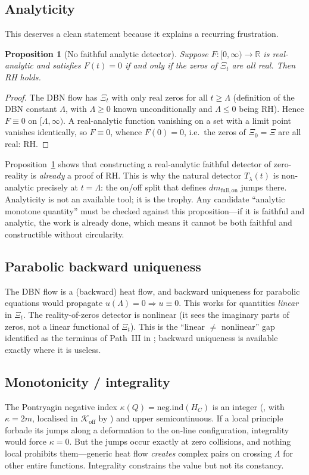 \documentclass[11pt]{amsart}
\newtheorem{proposition}[theorem]{Proposition}
\theoremstyle{definition}
\theoremstyle{remark}
\newcommand{\bbR}{\mathbb{R}}
\newcommand{\dmon}{dm_{\mathrm{full,on}}}
\newcommand{\Tl}{T_\lambda}
\newcommand{\negind}{\mathrm{neg.ind}}
\begin{document}
\subsection{Analyticity}\label{ssec:analyticity}
This deserves a clean statement because it explains a recurring
frustration.

\begin{proposition}[No faithful analytic detector]\label{prop:analytic}
Suppose $F:[0,\infty)\to\bbR$ is real-analytic and satisfies $F(t)=0$ if
and only if the zeros of $\Xi_t$ are all real. Then RH holds.
\end{proposition}
\begin{proof}
The DBN flow has $\Xi_t$ with only real zeros for all $t\geq\Lambda$
(definition of the DBN constant $\Lambda$, with $\Lambda\geq0$ known
unconditionally and $\Lambda\leq0$ being RH). Hence $F\equiv0$ on
$[\Lambda,\infty)$. A real-analytic function vanishing on a set with a
limit point vanishes identically, so $F\equiv0$, whence $F(0)=0$, i.e.\ the
zeros of $\Xi_0=\Xi$ are all real: RH.
\end{proof}

Proposition~\ref{prop:analytic} shows that constructing a real-analytic
faithful detector of zero-reality is \emph{already} a proof of RH. This is
why the natural detector $\Tl(t)$ is non-analytic precisely at $t=\Lambda$:
the on/off split that defines $\dmon$ jumps there. Analyticity is not an
available tool; it is the trophy. Any candidate ``analytic monotone
quantity'' must be checked against this proposition---if it is faithful and
analytic, the work is already done, which means it cannot be both faithful
and constructible without circularity.

\subsection{Parabolic backward uniqueness}
The DBN flow is a (backward) heat flow, and backward uniqueness for
parabolic equations would propagate $u(\Lambda)=0\Rightarrow u\equiv0$.
This works for quantities \emph{linear} in $\Xi_t$. The reality-of-zeros
detector is nonlinear (it sees the imaginary parts of zeros, not a linear
functional of $\Xi_t$). This is the ``linear $\neq$ nonlinear'' gap
identified as the terminus of Path~III in \cite{P40}; backward uniqueness
is available exactly where it is useless.

\subsection{Monotonicity / integrality}
The Pontryagin negative index $\kappa(Q)=\negind(H_C)$ is an integer
(\cite{P35}, with $\kappa=2m$, localised in $\mathcal{K}_{\mathrm{off}}$ by
\cite[Thm~8.1]{P40}) and upper semicontinuous. If a local principle
forbade its jumps along a deformation to the on-line configuration,
integrality would force $\kappa=0$. But the jumps occur exactly at zero
collisions, and nothing local prohibits them---generic heat flow
\emph{creates} complex pairs on crossing $\Lambda$ for other entire
functions. Integrality constrains the value but not its constancy.
\end{document}

